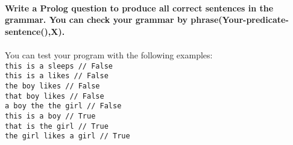 \documentclass [11pt, a4wide, twoside]{article}
\begin{document}
\begin{enumerate}
\\
\textbf{Write a Prolog question to produce all correct sentences in the grammar. You can check your grammar by phrase(Your-predicate-sentence(),X).}\\ \\
%
You can test your program with the following examples: \\
\texttt{this is a sleeps // False} \\
\texttt{this is a likes // False} \\
\texttt{the boy likes // False} \\
\texttt{that boy likes // False} \\
\texttt{a boy the the girl // False} \\
\texttt{this is a boy // True} \\
\texttt{that is the girl // True} \\
\texttt{the girl likes a girl // True}


\solution{\fontsize{9pt}{11pt}}




\end{enumerate}
\end{document}
